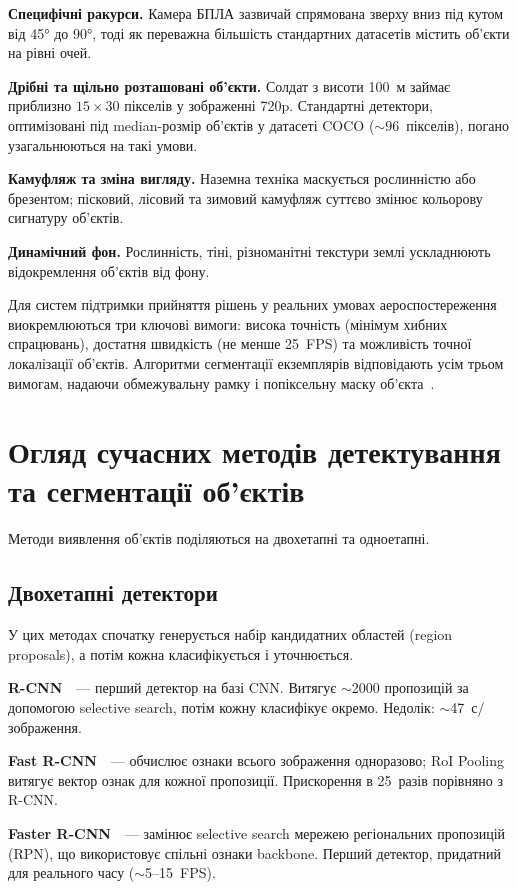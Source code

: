 \documentclass[14pt,a4paper]{extreport}
\begin{document}
\textbf{Специфічні ракурси.} Камера БПЛА зазвичай спрямована зверху вниз
під кутом від 45° до 90°, тоді як переважна більшість стандартних
датасетів містить об'єкти на рівні очей.

\textbf{Дрібні та щільно розташовані об'єкти.} Солдат з висоти 100~м
займає приблизно $15\times30$ пікселів у зображенні 720p.
Стандартні детектори, оптимізовані під median-розмір об'єктів у
датасеті COCO ($\sim$96~пікселів), погано узагальнюються на такі умови.

\textbf{Камуфляж та зміна вигляду.} Наземна техніка маскується
рослинністю або брезентом; пісковий, лісовий та зимовий камуфляж суттєво
змінює кольорову сигнатуру об'єктів.

\textbf{Динамічний фон.} Рослинність, тіні, різноманітні текстури землі
ускладнюють відокремлення об'єктів від фону.

Для систем підтримки прийняття рішень у реальних умовах
аероспостереження виокремлюються три ключові вимоги: висока точність
(мінімум хибних спрацювань), достатня швидкість (не менше 25~FPS) та
можливість точної локалізації об'єктів. Алгоритми сегментації екземплярів
відповідають усім трьом вимогам, надаючи обмежувальну рамку і попіксельну
маску об'єкта~\cite{maskrcnn2017}.

\section{Огляд сучасних методів детектування та сегментації об'єктів}

Методи виявлення об'єктів поділяються на двохетапні та одноетапні.

\subsection*{Двохетапні детектори}

У цих методах спочатку генерується набір кандидатних областей (region
proposals), а потім кожна класифікується і уточнюється.

\textbf{R-CNN}~\cite{rcnn2014}~--- перший детектор на базі CNN. Витягує
$\sim$2000 пропозицій за допомогою selective search, потім кожну
класифікує окремо. Недолік: $\sim$47~с/зображення.

\textbf{Fast R-CNN}~\cite{fastrcnn2015}~--- обчислює ознаки всього
зображення одноразово; RoI Pooling витягує вектор ознак для кожної
пропозиції. Прискорення в 25~разів порівняно з R-CNN.

\textbf{Faster R-CNN}~\cite{fasterrcnn2017}~--- замінює selective search
мережею регіональних пропозицій (RPN), що використовує спільні ознаки
backbone. Перший детектор, придатний для реального часу ($\sim$5--15~FPS).
\end{document}
